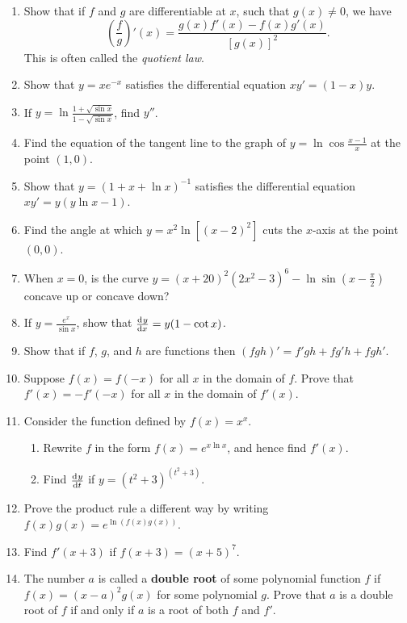 \begin{enumerate}
  \item Show that if $ f $ and $ g $ are differentiable at $ x $, such that $ g(x) \neq 0 $, we have
        \begin{displaymath}
          \left( \frac{f}{g} \right)'(x) = \frac{g(x)f'(x) - f(x)g'(x)}{[g(x)]^2}.
        \end{displaymath}
        This is often called the \emph{quotient law}.
  \item Show that $ y = xe^{-x} $ satisfies the differential equation $ xy' = (1-x)y $.
  \item If $ y = \ln \frac{1 + \sqrt{\sin x}}{1 - \sqrt{\sin x}} $, find $ y'' $.
  \item Find the equation of the tangent line to the graph of $ y = \ln \cos \frac{x - 1}{x} $ at
        the point $(1, 0)$.
  \item Show that $ y = (1 + x + \ln x)^{-1} $ satisfies the differential equation $ xy' = y(y \ln x - 1) $.
  \item Find the angle at which $ y = x^2 \ln [(x - 2)^2] $ cuts the $ x$-axis at the point $ (0,0) $.
  \item When $ x = 0 $, is the curve $ y = (x + 20)^2 (2x^2 - 3)^6 - \ln \sin (x - \frac{\pi}{2}) $ concave up or concave down?
  \item If $ y = \frac{e^x}{\sin x} $, show that $ \od{y}{x} = y(1 - \cot x) $.
  \item Show that if $ f $, $ g $, and $ h $ are functions then $ (fgh)' = f'gh + fg'h + fgh' $.
  \item Suppose $ f(x) = f(-x) $ for all $ x $ in the domain of $ f $. Prove that $ f'(x) = -f'(-x) $ for all $ x $
        in the domain of $ f'(x) $.
  \item Consider the function defined by $ f(x) = x^x $.
    \begin{enumerate}
      \item Rewrite $ f $ in the form $ f(x) = e^{x \ln x} $, and hence find $ f'(x) $.
      \item Find $ \od{y}{t} $ if $ y = (t^2 + 3)^{(t^2 + 3)} $.
    \end{enumerate}
  \item Prove the product rule a different way by writing $ f(x) g(x) = e^{\ln(f(x) g(x))} $.
  \item Find $ f'(x + 3) $ if $ f(x + 3) = (x + 5)^7 $.
  \item The number $ a $ is called a \textbf{double root} of some polynomial function $ f $ if $ f(x) = (x - a)^2g(x) $ for
        some polynomial $ g $. Prove that $ a $ is a double root of $ f $ if and only if $ a $ is a root of both $ f $ and $ f' $.
\end{enumerate}

